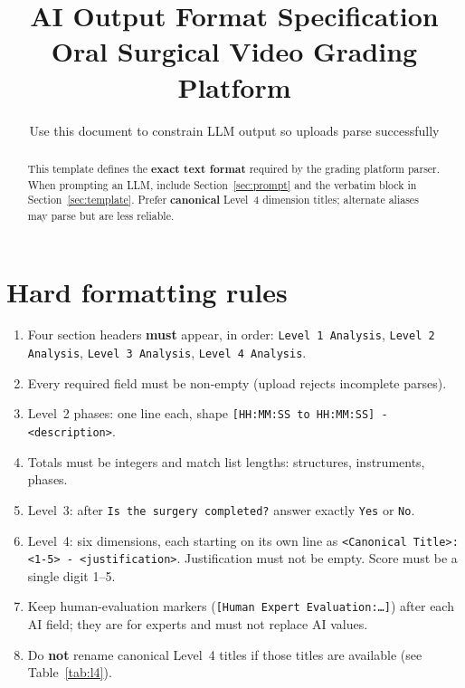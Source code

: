 \documentclass[11pt,a4paper]{article}
\title{AI Output Format Specification\\[0.4em]
\large Oral Surgical Video Grading Platform}
\author{Use this document to constrain LLM output so uploads parse successfully}
\date{}
\begin{document}
\maketitle

\begin{abstract}
This template defines the \textbf{exact text format} required by the grading
platform parser. When prompting an LLM, include Section~\ref{sec:prompt} and
the verbatim block in Section~\ref{sec:template}. Prefer \textbf{canonical}
Level~4 dimension titles; alternate aliases may parse but are less reliable.
\end{abstract}

\tableofcontents
\vspace{1em}

\section{Hard formatting rules}
\label{sec:rules}

\begin{enumerate}[leftmargin=*]
  \item Four section headers \textbf{must} appear, in order:
        \texttt{Level 1 Analysis}, \texttt{Level 2 Analysis},
        \texttt{Level 3 Analysis}, \texttt{Level 4 Analysis}.
  \item Every required field must be non-empty (upload rejects incomplete parses).
  \item Level~2 phases: one line each, shape
        \texttt{[HH:MM:SS to HH:MM:SS] - <description>}.
  \item Totals must be integers and match list lengths:
        structures, instruments, phases.
  \item Level~3: after \texttt{Is the surgery completed?} answer exactly
        \texttt{Yes} or \texttt{No}.
  \item Level~4: six dimensions, each starting on its own line as
        \texttt{<Canonical Title>: <1-5> - <justification>}.
        Justification must not be empty. Score must be a single digit 1--5.
  \item Keep human-evaluation markers
        (\texttt{[Human Expert Evaluation:\ldots]}) after each AI field;
        they are for experts and must not replace AI values.
  \item Do \textbf{not} rename canonical Level~4 titles if those titles are
        available (see Table~\ref{tab:l4}).
\end{enumerate}
\end{document}
